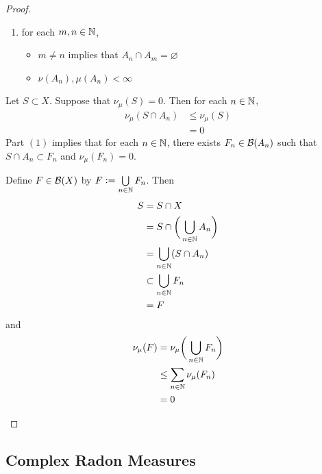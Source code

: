 \documentclass{book}
\begin{document}
\begin{proof}
\begin{enumerate}
\begin{enumerate}
				\item for each $m,n \in \mathbb{N}$,
				\begin{itemize}
					\item $m \neq n$ implies that $A_n \cap A_m = \varnothing$
					\item $\nu(A_n), \mu(A_n) < \infty$
				\end{itemize}
			\end{enumerate} 
			Let $S \subset X$. Suppose that $\nu_{\mu}(S) = 0$. Then for each $n \in \mathbb{N}$,  
			\begin{align*}
				\nu_{\mu}(S \cap A_n) 
				& \leq \nu_{\mu}(S) \\
				& = 0 
			\end{align*} 
			Part $(1)$ implies that for each $n \in \mathbb{N}$, there exists $F_n \in \mathcal{B}(A_n)$ such that $S \cap A_n \subset F_n$ and $\nu_{\mu}(F_n) = 0$.
			
			
			Define $F \in \mathcal{B}(X)$ by $F \vcentcolon= \bigcup\limits_{n \in \mathbb{N}} F_n$. Then
			\begin{align*}
				S
				& = S \cap X \\
				& = S \cap \bigg( \bigcup\limits_{n \in \mathbb{N}} A_n \bigg) \\
				& = \bigcup\limits_{n \in \mathbb{N}} (S \cap A_n) \\
				& \subset \bigcup\limits_{n \in \mathbb{N}} F_n \\
				& = F
			\end{align*}
			and 
			\begin{align*}
				\nu_{\mu}(F)
				& = \nu_{\mu}\bigg( \bigcup\limits_{n \in \mathbb{N}} F_n \bigg) \\
				& \leq \sum\limits_{n \in \mathbb{N}} \nu_{\mu}(F_n) \\
				& = 0
			\end{align*}
		\end{enumerate}
	\end{proof}
	






	
	
	
	
	
	
	
	
	
	
	
	
	
	
	
	
	
	
	
	
	\subsection{Complex Radon Measures}
	
\end{document}
